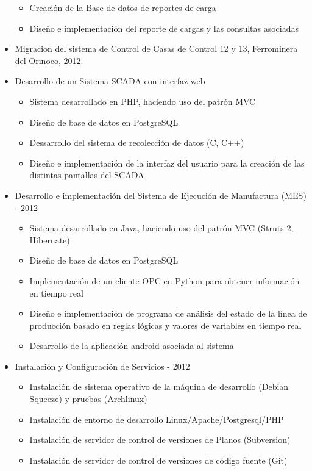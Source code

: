 \documentclass[letterpaper,11pt]{report}
\begin{document}
\begin{itemize}
      \begin{itemize}
        \item Creación de la Base de datos de reportes de carga
        \item Diseño e implementación del reporte de cargas y las consultas asociadas
      \end{itemize}
    \item Migracion del sistema de Control de Casas de Control 12 y 13, Ferrominera del Orinoco, 2012.
    \item Desarrollo de un Sistema SCADA con interfaz web
        \begin{itemize}
        \item Sistema desarrollado en PHP, haciendo uso del patrón MVC
        \item Diseño de base de datos en PostgreSQL
        \item Dessarrollo del sistema de recolección de datos (C, C++)
        \item Diseño e implementación de la interfaz del usuario para la creación de las distintas pantallas del SCADA
        \end{itemize}
    \item Desarrollo e implementación del Sistema de Ejecución de Manufactura (MES) - 2012
        \begin{itemize}
        \item Sistema desarrollado en Java, haciendo uso del patrón MVC (Struts 2, Hibernate)
        \item Diseño de base de datos en PostgreSQL
        \item Implementación de un cliente OPC en Python para obtener información en tiempo real
        \item Diseño e implementación de programa de análisis del estado de la línea de producción basado en reglas lógicas y valores de variables en tiempo real
        \item Desarrollo de la aplicación android asociada al sistema
        \end{itemize}
    \item Instalación y Configuración de Servicios - 2012
        \begin{itemize}
        \item Instalación de sistema operativo de la máquina de desarrollo (Debian Squeeze) y pruebas (Archlinux)
        \item Instalación de entorno de desarrollo Linux/Apache/Postgresql/PHP
        \item Instalación de servidor de control de versiones de Planos (Subversion)
        \item Instalación de servidor de control de versiones de código fuente (Git)
        \end{itemize}
  \end{itemize}
\end{document}
